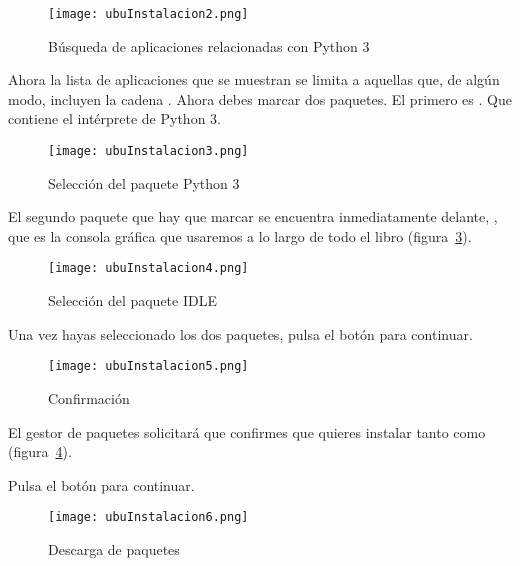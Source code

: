 \begin{figure}[!h]
  \begin{center}
\texttt{[image: ubuInstalacion2.png]}
\caption{Búsqueda de aplicaciones relacionadas con Python 3}\label{figu02}
  \end{center}
\end{figure}

Ahora la lista de aplicaciones que se muestran se limita a aquellas que, de algún modo, incluyen la cadena . Ahora debes marcar dos paquetes. El primero es . Que contiene el intérprete de Python 3.

\begin{figure}[!h]
  \begin{center}
\texttt{[image: ubuInstalacion3.png]}
\caption{Selección del paquete Python 3}\label{figu03}
  \end{center}
\end{figure}

El segundo paquete que hay que marcar se encuentra inmediatamente delante, , que es la consola gráfica que usaremos a lo largo de todo el libro (figura~\ref{figu04}).

\begin{figure}[!h]
  \begin{center}
\texttt{[image: ubuInstalacion4.png]}
\caption{Selección del paquete IDLE}\label{figu04}
  \end{center}
\end{figure}

Una vez hayas seleccionado los dos paquetes, pulsa el botón  para continuar.

\begin{figure}[!h]
  \begin{center}
\texttt{[image: ubuInstalacion5.png]}
\caption{Confirmación}\label{figu05}
  \end{center}
\end{figure}

El gestor de paquetes solicitará que confirmes que quieres instalar tanto  como  (figura~\ref{figu05}).

Pulsa el botón  para continuar.

\begin{figure}[!h]
  \begin{center}
\texttt{[image: ubuInstalacion6.png]}
\caption{Descarga de paquetes}\label{figu06}
  \end{center}
\end{figure}

